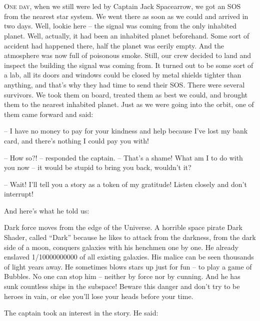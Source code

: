 \documentclass[ebook,oneside,final,openright]{memoir}
\begin{document}
\chapter{}
\par
\lettrine{O}{ne day,} when we still were led by Captain Jack Spacearrow, we got an SOS from the nearest star system. We went there as soon as we could and arrived in two days. Well, lookie here – the signal was coming from the only inhabited planet. Well, actually, it had been an inhabited planet beforehand. Some sort of accident had happened there, half the planet was eerily empty. And the atmosphere was now full of poisonous smoke. Still, our crew decided to land and inspect the building the signal was coming from. It turned out to be some sort of a lab, all its doors and windows could be closed by metal shields tighter than anything, and that’s why they had time to send their SOS. There were several survivors. We took them on board, treated them as best we could, and brought them to the nearest inhabited planet. Just as we were going into the orbit, one of them came forward and said: \par
\par
– I have no money to pay for your kindness and help because I’ve lost my bank card, and there’s nothing I could pay you with!\par
– How so?! – responded the captain. – That’s a shame! What am I to do with you now – it would be stupid to bring you back, wouldn’t it? \par
– Wait! I’ll tell you a story as a token of my gratitude! Listen closely and don’t interrupt! \par
 And here’s what he told us:\par
\par
Dark force moves from the edge of the Universe. A horrible space pirate Dark Shader, called “Dark” because he likes to attack from the darkness, from the dark side of a moon, conquers galaxies with his henchmen one by one. He already enslaved 1/10000000000 of all existing galaxies. His malice can be seen thousands of light years away. He sometimes blows stars up just for fun – to play a game of Bubbles. No one can stop him – neither by force nor by cunning. And he has sunk countless ships in the subspace! Beware this danger and don’t try to be heroes in vain, or else you’ll lose your heads before your time.\par
\par
The captain took an interest in the story. He said:\par
\end{document}
